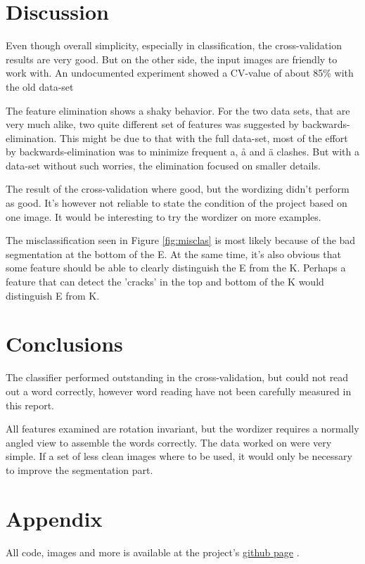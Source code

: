 \documentclass[a4paper,11pt]{article}
\begin{document}
\section{Discussion}

Even though overall simplicity, especially in classification, the cross-validation results are very good.
But on the other side, the input images are friendly to work with.
An undocumented experiment showed a CV-value of about 85\% with the old data-set 

The feature elimination shows a shaky behavior.
For the two data sets, that are very much alike,
two quite different set of features was suggested by backwards-elimination.
This might be due to that with the full data-set,
most of the effort by backwards-elimination was to minimize frequent a, å and ä clashes.
But with a data-set without such worries, the elimination focused on smaller details.

The result of the cross-validation where good, but the wordizing didn't perform as good.
It's however not reliable to state the condition of the project
based on one image. It would be interesting to try the wordizer on more examples.

The misclassification seen in Figure \ref{fig:misclas} is most likely
because of the bad segmentation at the bottom of the E.
At the same time, it's also obvious that some feature
should be able to clearly distinguish the E from the K.
Perhaps a feature that can detect the 'cracks' in the top and bottom
of the K would distinguish E from K.

\section{Conclusions}
The classifier performed outstanding in the cross-validation, 
but could not read out a word correctly, however word reading have not been
carefully measured in this report.

All features examined are rotation invariant, but the wordizer requires a normally angled view to assemble the words correctly.
The data worked on were very simple.
If a set of less clean images where to be used,
it would only be necessary to improve the segmentation part.

\section{Appendix}
All code, images and more is available at the project's \href{https://github.com/Tarrasch/AlphaBiscuit}{github page} .
\end{document}
